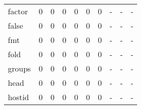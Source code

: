 \begin{longtable}{lp{2.0cm}p{2.0cm}p{2.0cm}p{2.0cm}p{2.0cm}p{2.0cm}p{2.0cm}p{2.0cm}p{2.0cm}}
factor    &                      0 &                                  0 &                                 0 &                                0 &                                 0 &                               0 &                                    - &                                      - &                                    - \\
false     &                      0 &                                  0 &                                 0 &                                0 &                                 0 &                               0 &                                    - &                                      - &                                    - \\
fmt       &                      0 &                                  0 &                                 0 &                                0 &                                 0 &                               0 &                                    - &                                      - &                                    - \\
fold      &                      0 &                                  0 &                                 0 &                                0 &                                 0 &                               0 &                                    - &                                      - &                                    - \\
groups    &                      0 &                                  0 &                                 0 &                                0 &                                 0 &                               0 &                                    - &                                      - &                                    - \\
head      &                      0 &                                  0 &                                 0 &                                0 &                                 0 &                               0 &                                    - &                                      - &                                    - \\
hostid    &                      0 &                                  0 &                                 0 &                                0 &                                 0 &                               0 &                                    - &                                      - &                                    - \\

\end{longtable}
